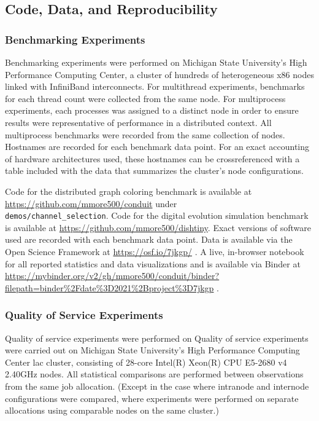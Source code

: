 \subsection{Code, Data, and Reproducibility}

\subsubsection{Benchmarking Experiments}

Benchmarking experiments were performed on Michigan State University's High Performance Computing Center, a cluster of hundreds of heterogeneous x86 nodes linked with InfiniBand interconnects.
For multithread experiments, benchmarks for each thread count were collected from the same node.
For multiprocess experiments, each processes was assigned to a distinct node in order to ensure results were representative of performance in a distributed context.
All multiprocess benchmarks were recorded from the same collection of nodes.
Hostnames are recorded for each benchmark data point.
For an exact accounting of hardware architectures used, these hostnames can be crossreferenced with a table included with the data that summarizes the cluster's node configurations.

Code for the distributed graph coloring benchmark is available at \url{https://github.com/mmore500/conduit} under \\ \texttt{demos/channel\_selection}.
Code for the digital evolution simulation benchmark is available at \url{https://github.com/mmore500/dishtiny}.
Exact versions of software used are recorded with each benchmark data point.
Data is available via the Open Science Framework at \url{https://osf.io/7jkgp/} \cite{foster2017open}.
A live, in-browser notebook for all reported statistics and data visualizations and is available via Binder at \url{https://mybinder.org/v2/gh/mmore500/conduit/binder?filepath=binder%2Fdate%3D2021%2Bproject%3D7jkgp} \cite{jupyter2018binder}.

\subsubsection{Quality of Service Experiments}

Quality of service experiments were performed on Quality of service experiments were carried out on Michigan State University's High Performance Computing Center lac cluster, consisting of 28-core Intel(R) Xeon(R) CPU E5-2680 v4 \@ 2.40GHz nodes.
All statistical comparisons are performed between observations from the same job allocation.
(Except in the case where intranode and internode configurations were compared, where experiments were performed on separate allocations using comparable nodes on the same cluster.)

